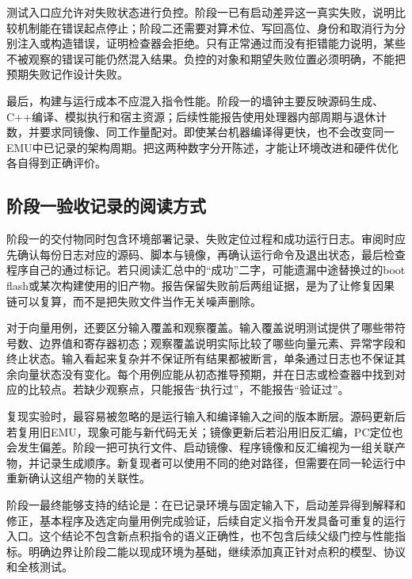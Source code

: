 测试入口应允许对失败状态进行负控。阶段一已有启动差异这一真实失败，说明比较机制能在错误起点停止；阶段二还需要对算术位、写回高位、身份和取消行为分别注入或构造错误，证明检查器会拒绝。只有正常通过而没有拒错能力说明，某些不被观察的错误可能仍然混入结果。负控的对象和期望失败位置必须明确，不能把预期失败记作设计失败。\par


最后，构建与运行成本不应混入指令性能。阶段一的墙钟主要反映源码生成、C++编译、模拟执行和宿主资源；后续性能报告使用处理器内部周期与退休计数，并要求同镜像、同工作量配对。即使某台机器编译得更快，也不会改变同一EMU中已记录的架构周期。把这两种数字分开陈述，才能让环境改进和硬件优化各自得到正确评价。\par


\subsection{阶段一验收记录的阅读方式}


阶段一的交付物同时包含环境部署记录、失败定位过程和成功运行日志。审阅时应先确认每份日志对应的源码、脚本与镜像，再确认运行命令及退出状态，最后检查程序自己的通过标记。若只阅读汇总中的“成功”二字，可能遗漏中途替换过的boot flash或某次构建使用的旧产物。报告保留失败前后两组证据，是为了让修复因果链可以复算，而不是把失败文件当作无关噪声删除。\par


对于向量用例，还要区分输入覆盖和观察覆盖。输入覆盖说明测试提供了哪些带符号数、边界值和寄存器初态；观察覆盖说明实际比较了哪些向量元素、异常字段和终止状态。输入看起来复杂并不保证所有结果都被断言，单条通过日志也不保证其余向量状态没有变化。每个用例应能从初态推导预期，并在日志或检查器中找到对应的比较点。若缺少观察点，只能报告“执行过”，不能报告“验证过”。\par


复现实验时，最容易被忽略的是运行输入和编译输入之间的版本断层。源码更新后若复用旧EMU，现象可能与新代码无关；镜像更新后若沿用旧反汇编，PC定位也会发生偏差。阶段一把可执行文件、启动镜像、程序镜像和反汇编视为一组关联产物，并记录生成顺序。新复现者可以使用不同的绝对路径，但需要在同一轮运行中重新确认这组产物的关联性。\par


阶段一最终能够支持的结论是：在已记录环境与固定输入下，启动差异得到解释和修正，基本程序及选定向量用例完成验证，后续自定义指令开发具备可重复的运行入口。这个结论不包含新点积指令的语义正确性，也不包含后续父级门控与性能指标。明确边界让阶段二能以现成环境为基础，继续添加真正针对点积的模型、协议和全核测试。\par

